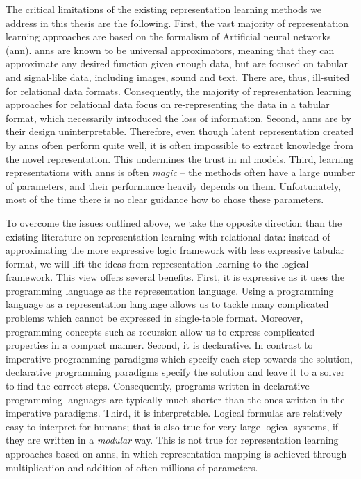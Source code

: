 The critical limitations of the existing representation learning methods we address in this thesis are the  following.
First, the vast majority of representation learning approaches are based on the formalism of Artificial neural networks (\gls{ann}).
\gls{ann}s are known to be universal approximators, meaning that they can approximate any desired function given enough data, but are focused on tabular and signal-like data, including images, sound and text.
There are, thus, ill-suited for relational data formats.
Consequently, the majority of representation learning approaches for relational data focus on re-representing the data in a tabular format, which necessarily introduced the loss of information.
Second, \gls{ann}s are by their design uninterpretable.
Therefore, even though latent representation created by \gls{ann}s often perform quite well, it is often impossible to extract knowledge from the novel representation.
This undermines the trust in \gls{ml} models.
Third, learning representations with \gls{ann}s is often \textit{magic} --  the methods often have a large number of parameters, and their performance heavily depends on them.
Unfortunately, most of the time there is no clear guidance how to chose these parameters.







To overcome the issues outlined above, we take the opposite direction than the existing literature on representation learning with relational data: instead of approximating the more expressive logic framework with less expressive tabular format, we will lift the ideas from representation learning to the logical framework.
This view offers several benefits.
First, it is expressive as it uses the programming language as the representation language. 
Using a programming language as a representation language allows us to tackle many complicated problems which cannot be expressed in single-table format.
Moreover, programming concepts such as recursion allow us to express complicated properties in a compact manner.
Second, it is declarative. 
In contrast to imperative programming paradigms which specify each step towards the solution, declarative programming paradigms specify the solution and leave it to a solver to find the correct steps.
Consequently, programs written in declarative programming languages are typically much shorter than the ones written in the imperative paradigms.
Third, it is interpretable. 
Logical formulas are relatively easy to interpret for humans; that is also true for very large logical systems, if they are written in a \textit{modular} way.
This is not true for representation learning approaches based on \gls{ann}s, in which representation mapping is achieved through multiplication and addition of often millions of parameters.
 


